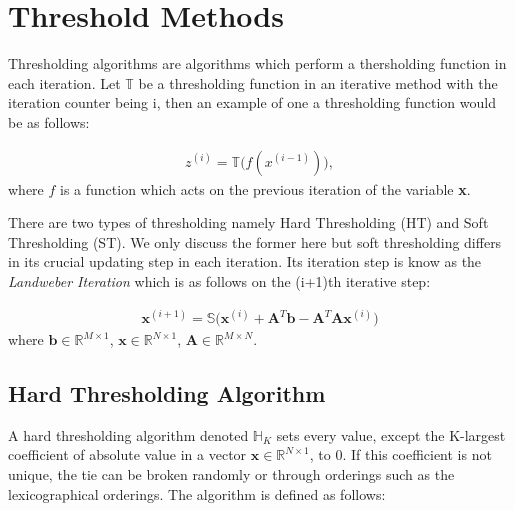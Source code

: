 \documentclass[titlepage,oneside, 12pt]{book}
\theoremstyle{break}
\begin{document}
\section{Threshold Methods}

Thresholding algorithms are algorithms which perform a thersholding function in each iteration. Let $\mathbb{T}$ be a thresholding function in an iterative method with the iteration counter being i, then an example of one a thresholding function would be as follows:

\begin{equation}
\begin{gathered}
z^{(i)} = \mathbb{T}\big(f(x^{(i-1)})\big), 
\end{gathered}
\label{eqn:THRESH}
\end{equation}
where $f$ is a function which acts on the previous iteration of the variable \textbf{x}.

There are two types of thresholding namely Hard Thresholding (HT) and Soft Thresholding (ST). We only discuss the former here but soft thresholding differs in its crucial updating step in each iteration. 
\newpage
Its iteration step is know as the \emph{Landweber Iteration} which is as follows on the (i+1)th iterative step:

\begin{equation}
\begin{gathered}
\textbf{x}^{(i + 1)} = \mathbb{S}\big(\textbf{x}^{(i)} + \textbf{A}^{T}\textbf{b} -  \textbf{A}^{T} \textbf{A}\textbf{x}^{(i)}\big)
\end{gathered}
\end{equation}\bigskip
where $\textbf{b} \in \mathbb{R}^{M \times 1} $, $\textbf{x} \in \mathbb{R}^{N \times 1}$, $\textbf{A} \in \mathbb{R}^{M \times N}$. 

\subsection{Hard Thresholding Algorithm}

A hard thresholding algorithm denoted $\mathbb{H}_{K}$ sets every value, except the K-largest coefficient of absolute value in a vector $\textbf{x} \in \mathbb{R}^{N \times 1}$, to 0.  If this coefficient is not unique, the tie can be broken randomly or through orderings such as the lexicographical orderings. The algorithm is defined as follows: 
\end{document}
